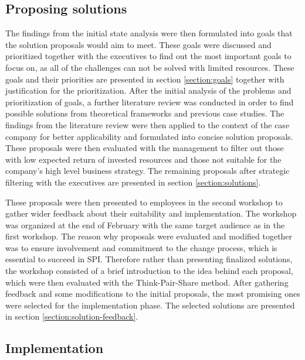 \subsection{Proposing solutions}

The findings from the initial state analysis were then formulated into goals that the solution proposals would aim to meet. These goals were discussed and prioritized together
with the executives to find out the most important goals to focus on, as all of the challenges can not be solved with limited resources. These goals and their priorities are
presented in section \ref{section:goals} together with justification for the prioritization. After the initial analysis of the problems and prioritization of goals, a further literature
review was conducted in order to find possible solutions from theoretical frameworks and previous case studies. The findings from the literature review were then applied to the context of
the case company for better applicability and formulated into concise solution proposals. These proposals were then evaluated with the management to filter out those with low
expected return of invested resources and those not suitable for the company's high level business strategy. The remaining proposals after strategic filtering with the executives
are presented in section \ref{section:solutions}.

These proposals were then presented to employees in the second workshop to gather wider feedback about their suitability and implementation. The workshop was organized at the end 
of February with the same target audience as in the first workshop. The reason why proposals were evaluated and modified together was to ensure involvement and commitment
to the change process, which is essential to succeed in SPI. Therefore rather than presenting finalized solutions, the workshop consisted of a brief introduction to the idea
behind each proposal, which were then evaluated with the Think-Pair-Share method. After gathering feedback and some modifications to the initial proposals, the most promising ones
were selected for the implementation phase. The selected solutions are presented in section \ref{section:solution-feedback}.

\subsection{Implementation}

